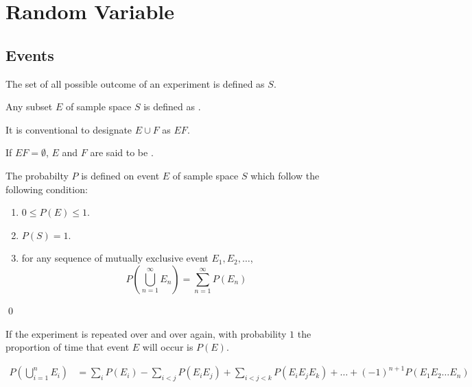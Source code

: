 \chapter{Random Variable}

\section{Events}

\begin{definition}
    The set of all possible outcome of an experiment is defined as  $S$.
\end{definition}

\begin{definition}[event]
    Any subset $E$ of sample space $S$ is defined as .
\end{definition}

It is conventional to designate $E \cup F$ as $EF$.


\begin{definition}
    If $EF = \emptyset $, $E$ and $F$ are said to be .
\end{definition}

\begin{definition}
    The probabilty $P$ is defined on event $E$ of sample space $S$ which follow the following condition:
    \begin{enumerate}
        \item $0 \leq P(E) \leq 1$.
        \item $P(S) = 1$.
        \item for any sequence of mutually exclusive event $E_1, E_2, \dots$,
            \begin{equation*}
                P \left(\bigcup_{n=1}^\infty E_n \right) = \sum_{n=1}^\infty P(E_n)
            \end{equation*}
        
    \end{enumerate}
    \qed
\end{definition}

If the experiment is repeated over and over again, with probability $1$ the proportion of time that event $E$ will occur is $P(E)$.

\begin{theorem}
    \begin{equation}
        \begin{aligned}
            P(\bigcup_{i=1}^n E_i) &= \sum_i P(E_i) - \sum_{i < j}P(E_i E_j) + \sum_{i < j < k} P(E_i E_j E_k) + \dots + (-1)^{n+1} P(E_1 E_2 \dots E_n)
        \end{aligned}
    \end{equation}
\end{theorem}

